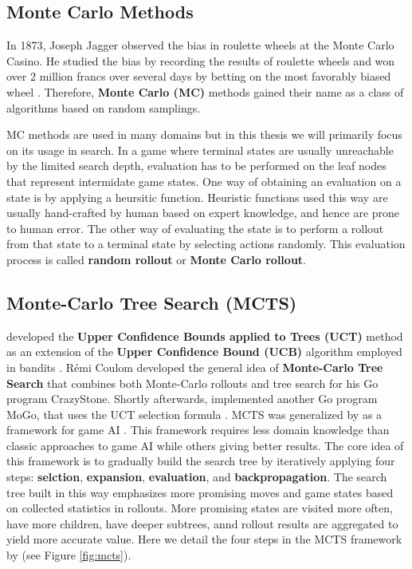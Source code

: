 \documentclass[12pt]{article}
\begin{document}
\subsection{Monte Carlo Methods}
In 1873, Joseph Jagger observed the bias in roulette wheels at the Monte Carlo Casino.
He studied the bias by recording the results of roulette wheels and won over 2 million francs over several days by betting on the most favorably biased wheel \cite{MonteCarloCasino__2022}.
Therefore, \textbf{Monte Carlo (MC)} methods gained their name as a class of algorithms based on random samplings.

MC methods are used in many domains but in this thesis we will primarily focus on its usage in search.
In a game where terminal states are usually unreachable by the limited search depth, evaluation has to be performed on the leaf nodes that represent intermidate game states.
One way of obtaining an evaluation on a state is by applying a heursitic function.
Heuristic functions used this way are usually hand-crafted by human based on expert knowledge, and hence are prone to human error.
The other way of evaluating the state is to perform a rollout from that state to a terminal state by selecting actions randomly.
This evaluation process is called \textbf{random rollout} or \textbf{Monte Carlo rollout}.

\subsection{Monte-Carlo Tree Search (MCTS)} \label{sec:mcts}

\citeauthor{BanditBasedMonteCarlo_Kocsis.Szepesvari_2006} developed the \textbf{Upper Confidence Bounds applied to Trees (UCT)} method as an extension of the \textbf{Upper Confidence Bound (UCB)} algorithm employed in bandits \cite{BanditBasedMonteCarlo_Kocsis.Szepesvari_2006}.
Rémi Coulom developed the general idea of \textbf{Monte-Carlo Tree Search} that combines both Monte-Carlo rollouts and tree search \cite{EfficientSelectivityBackup_Coulom_2007} for his Go program CrazyStone.
Shortly afterwards,
\citeauthor{ModificationUCTPatterns_Gelly.Wang.ea_2006} implemented another Go program MoGo, that uses the UCT selection formula \cite{ModificationUCTPatterns_Gelly.Wang.ea_2006}.
MCTS was generalized by \citeauthor{MonteCarloTreeSearch_Chaslot.Bakkes.ea_2008} as a framework for game AI \cite{MonteCarloTreeSearch_Chaslot.Bakkes.ea_2008}.
This framework requires less domain knowledge than classic approaches to game AI while others giving better results.
The core idea of this framework is to gradually build the search tree by iteratively applying four steps: \textbf{selction}, \textbf{expansion}, \textbf{evaluation}, and \textbf{backpropagation}.
The search tree built in this way emphasizes more promising moves and game states based on collected statistics in rollouts.
More promising states are visited more often, have more children, have deeper subtrees, annd rollout results are aggregated to yield more accurate value. Here we detail the four steps in the MCTS framework by \citeauthor{MonteCarloTreeSearch_Chaslot.Bakkes.ea_2008} (see Figure \ref{fig:mcts}).
\end{document}

